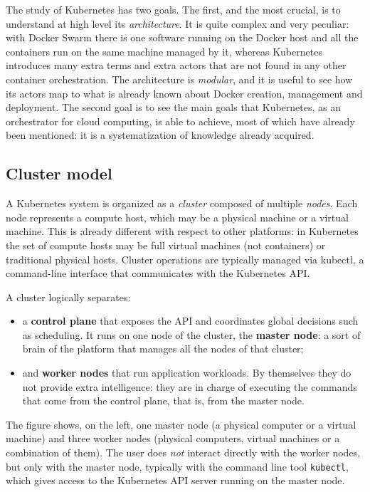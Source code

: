 The study of Kubernetes has two goals. The first, and the most crucial, is to understand at high level its \emph{architecture}. It is quite complex and very peculiar: with Docker Swarm there is one software running on the Docker host and all the containers run on the same machine managed by it, whereas Kubernetes introduces many extra terms and extra actors that are not found in any other container orchestration. The architecture is \emph{modular}, and it is useful to see how its actors map to what is already known about Docker creation, management and deployment. The second goal is to see the main goals that Kubernetes, as an orchestrator for cloud computing, is able to achieve, most of which have already been mentioned: it is a systematization of knowledge already acquired.

\subsection{Cluster model}

A Kubernetes system is organized as a \emph{cluster} composed of multiple \emph{nodes}. Each node represents a compute host, which may be a physical machine or a virtual machine. This is already different with respect to other platforms: in Kubernetes the set of compute hosts may be full virtual machines (not containers) or traditional physical hosts. Cluster operations are typically managed via kubectl, a command-line interface that communicates with the Kubernetes API.

\begin{center}
\end{center}

A cluster logically separates:

\begin{itemize}
\item a \textbf{control plane} that exposes the API and coordinates global decisions such as scheduling. It runs on one node of the cluster, the \textbf{master node}: a sort of brain of the platform that manages all the nodes of that cluster;
\item and \textbf{worker nodes} that run application workloads. By themselves they do not provide extra intelligence: they are in charge of executing the commands that come from the control plane, that is, from the master node.
\end{itemize}

The figure shows, on the left, one master node (a physical computer or a virtual machine) and three worker nodes (physical computers, virtual machines or a combination of them). The user does \emph{not} interact directly with the worker nodes, but only with the master node, typically with the command line tool \texttt{kubectl}, which gives access to the Kubernetes API server running on the master node.

